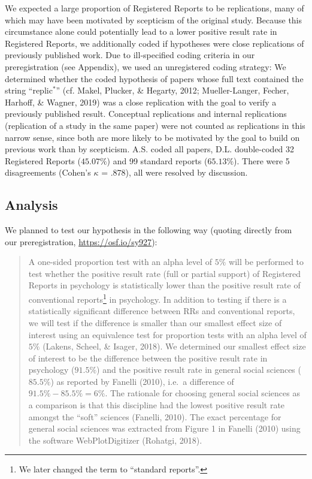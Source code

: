 \documentclass[british,,jou,floatsintext]{apa6}
\begin{document}
We expected a large proportion of Registered Reports to be replications, many of which may have been motivated by scepticism of the original study.
Because this circumstance alone could potentially lead to a lower positive result rate in Registered Reports, we additionally coded if hypotheses were close replications of previously published work.
Due to ill-specified coding criteria in our preregistration (see Appendix), we used an unregistered coding strategy:
We determined whether the coded hypothesis of papers whose full text contained the string \enquote{replic\(^\ast\)} (cf. Makel, Plucker, \& Hegarty, 2012; Mueller-Langer, Fecher, Harhoff, \& Wagner, 2019) was a close replication with the goal to verify a previously published result.
Conceptual replications and internal replications (replication of a study in the same paper) were not counted as replications in this narrow sense, since both are more likely to be motivated by the goal to build on previous work than by scepticism.
A.S. coded all papers, D.L. double-coded 32 Registered Reports (\(45.07 \%\)) and 99 standard reports (\(65.13 \%\)).
There were 5 disagreements (Cohen's \(\kappa\) = .878), all were resolved by discussion.

\hypertarget{analysis}{%
\subsection{Analysis}\label{analysis}}

We planned to test our hypothesis in the following way (quoting directly from our preregistration, \url{https://osf.io/sy927}):

\begin{quote}
A one-sided proportion test with an alpha level of \(5\%\) will be performed to test whether the positive result rate (full or partial support) of Registered Reports in psychology is statistically lower than the positive result rate of conventional reports\footnote{We later changed the term to \enquote{standard reports}.} in psychology.
In addition to testing if there is a statistically significant difference between RRs and conventional reports, we will test if the difference is smaller than our smallest effect size of interest using an equivalence test for proportion tests with an alpha level of \(5\%\) (Lakens, Scheel, \& Isager, 2018).
We determined our smallest effect size of interest to be the difference between the positive result rate in psychology (\(91.5\%\)) and the positive result rate in general social sciences (\(85.5\%\)) as reported by Fanelli (2010), i.e.~a difference of \(91.5\% - 85.5\% = 6\%\).
The rationale for choosing general social sciences as a comparison is that this discipline had the lowest positive result rate amongst the \enquote{soft} sciences (Fanelli, 2010).
The exact percentage for general social sciences was extracted from Figure 1 in Fanelli (2010) using the software WebPlotDigitizer (Rohatgi, 2018).
\end{quote}
\end{document}
